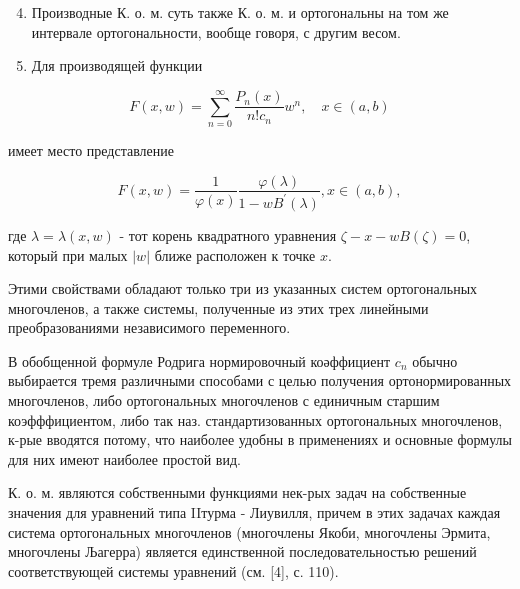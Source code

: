 \documentclass[10pt]{article}
\begin{document}
\begin{enumerate}

  \setcounter{enumi}{3}

  \item Производные К. о. м. суть также К. о. м. и ортогональны на том же интервале ортогональности, вообще говоря, с другим весом.



  \item Для производящей функции



\end{enumerate}



\[

F(x, w)=\sum_{n=0}^{\infty} \frac{P_{n}(x)}{n ! c_{n}} w^{n}, \quad x \in(a, b)

\]



имеет место представление



\[

F(x, w)=\frac{1}{\varphi(x)} \frac{\varphi(\lambda)}{1-w B^{\prime}(\lambda)}, x \in(a, b),

\]



где $\lambda=\lambda(x, w)$ - тот корень квадратного уравнения $\zeta-x-w B(\zeta)=0$, который при малых $|w|$ ближе расположен к точке $x$.



Этими свойствами обладают только три из указанных систем ортогональных многочленов, а также системы, полученные из этих трех линейными преобразованиями независимого переменного.



В обобщенной формуле Родрига нормировочный коәффициент $c_{n}$ обычно выбирается тремя различными способами с целью получения ортонормированных многочленов, либо ортогональных многочленов с единичным старшим коэфффициентом, либо так наз. стандартизованных ортогональных многочленов, к-рые вводятся потому, что наиболее удобны в применениях и основные формулы для них имеют наиболее простой вид.



К. о. м. являются собственными функциями нек-рых задач на собственные значения для уравнений типа IIтурма - Лиувилля, причем в этих задачах каждая система ортогональных многочленов (многочлены Якоби, многочлены Эрмита, многочлены Љагерра) является единственной последовательностью решений соответствующей системы уравнений (см. [4], с. 110).
\end{document}
